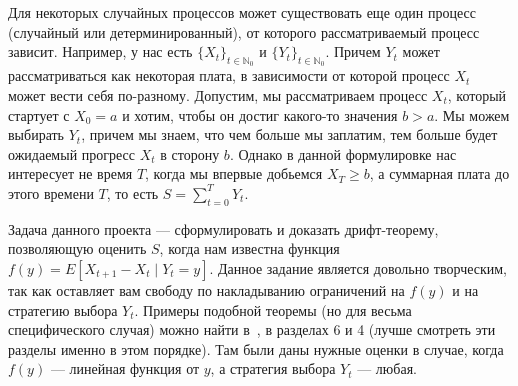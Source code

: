 \documentclass[12pt]{article}
\newcommand\N{\mathbb{N}}
\begin{document}
Для некоторых случайных процессов может существовать еще один процесс (случайный или детерминированный), от которого рассматриваемый процесс зависит. Например, у нас есть $\{X_t\}_{t \in \N_0}$ и $\{Y_t\}_{t \in \N_0}$. Причем $Y_t$ может рассматриваться как некоторая плата, в зависимости от которой процесс $X_t$ может вести себя по-разному. Допустим, мы рассматриваем процесс $X_t$, который стартует с $X_0 = a$ и хотим, чтобы он достиг какого-то значения $b > a$. Мы можем выбирать $Y_t$, причем мы знаем, что чем больше мы заплатим, тем больше будет ожидаемый прогресс $X_t$ в сторону $b$. Однако в данной формулировке нас интересует не время $T$, когда мы впервые добьемся $X_T \ge b$, а суммарная плата до этого времени $T$, то есть $S = \sum_{t = 0}^T Y_t$. 

Задача данного проекта --- сформулировать и доказать дрифт-теорему, позволяющую оценить $S$, когда нам известна функция $f(y) = E[X_{t + 1} - X_t \mid Y_t = y]$. Данное задание является довольно творческим, так как оставляет вам свободу по накладыванию ограничений на $f(y)$ и на стратегию выбора $Y_t$. Примеры подобной теоремы (но для весьма специфического случая) можно найти в~\cite{AntipovDK19}, в разделах 6 и 4 (лучше смотреть эти разделы именно в этом порядке). Там были даны нужные оценки в случае, когда $f(y)$ --- линейная функция от $y$, а стратегия выбора $Y_t$ --- любая.




\end{document}
